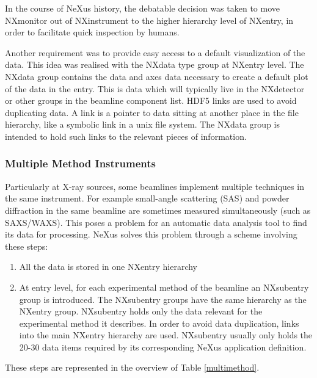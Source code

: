 \documentclass[%
 aip,
rsi,
 amsmath,amssymb,
 reprint,%
]{revtex4-1}
\begin{document}
In the course of NeXus history,
the debatable decision was taken to move NXmonitor
out of NXinstrument to the higher hierarchy level of NXentry,
in order to facilitate quick inspection by humans.

Another requirement was to provide easy access to a default visualization of the data. This idea was realised with the 
NXdata type group at NXentry level. The NXdata group contains the data and axes data necessary to create a default plot of 
the data in the entry. This is data which will typically live in the NXdetector or other groups in the 
beamline component list. HDF5 links are used to avoid duplicating data. A link 
is a pointer to data sitting at another place in the file hierarchy, like a symbolic link in a unix 
file system.  The NXdata group is intended to hold such links to the relevant pieces of information.

\subsubsection{Multiple Method Instruments}

Particularly at X-ray sources, some beamlines implement multiple techniques in the same instrument. 
For example small-angle scattering (SAS) and powder diffraction in the same beamline are sometimes measured 
simultaneously (such as SAXS/WAXS). This poses a problem for an automatic data analysis tool to find its data 
for processing.  NeXus solves this problem through a scheme involving these steps:
\begin{enumerate}
\item All the data is stored in one NXentry hierarchy
\item At entry level, for each experimental method of the beamline an NXsubentry group is introduced. The 
  NXsubentry groups have the same hierarchy as the  NXentry group. NXsubentry holds only the data relevant 
  for the experimental method it describes. In order to avoid data duplication, links into the main NXentry 
  hierarchy are used. 
  NXsubentry usually only holds the 20-30 data items required by its corresponding NeXus 
  application definition.  
\end{enumerate} 
These steps are represented in the overview of Table \ref{multimethod}.
\end{document}
